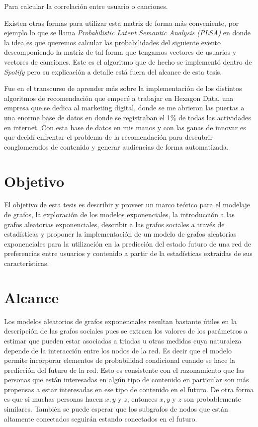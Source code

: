 Para calcular la correlación entre usuario o canciones.

Existen otras formas para utilizar esta matriz de forma más conveniente, por ejemplo lo que se llama \textit{Probabilistic Latent Semantic Analysis (PLSA)} en donde la idea es que queremos calcular las probabilidades del siguiente evento descomponiendo la matriz de tal forma que tengamos vectores de usuarios y vectores de canciones. Este es el algoritmo que de hecho se implementó dentro de \textit{Spotify} pero su explicación a detalle está fuera del alcance de esta tesis.

Fue en el transcurso de aprender más sobre la implementación de los distintos algoritmos de recomendación que empecé a trabajar en Hexagon Data, una empresa que se dedica al marketing digital, donde se me abrieron las puertas a una enorme base de datos en donde se registraban el 1\% de todas las actividades en internet. Con esta base de datos en mis manos y con las ganas de innovar es que decidí enfrentar el problema de la recomendación para descubrir conglomerados de contenido y generar audiencias de forma automatizada.


\section{Objetivo}

El objetivo de esta tesis es describir y proveer un marco teórico para el modelaje de grafos, la exploración de los modelos exponenciales, la introducción a las grafos aleatorias exponenciales, describir a las grafos sociales a través de estadísticas y proponer la implementación de un modelo de grafos aleatorias exponenciales para la utilización en la predicción del estado futuro de una red de preferencias entre usuarios y contenido a partir de la estadísticas extraídas de sus características. 


\section{Alcance}

Los modelos aleatorios de grafos exponenciales resultan bastante útiles en la descripción de las grafos sociales pues se extraen los valores de los parámetros a estimar que pueden estar asociadas a triadas u otras medidas cuya naturaleza depende de la interacción entre los nodos de la red. Es decir que el modelo permite incorporar elementos de probabilidad condicional cuando se hace la predicción del futuro de la red. Esto es consistente con el razonamiento que las personas que están interesadas en algún tipo de contenido en particular son más propensas a estar interesadas en ese tipo de contenido en el futuro. De otra forma es que si muchas personas hacen $x, y$ y $z$, entonces $x, y$ y $z$ son probablemente similares. También se puede esperar que los subgrafos de nodos que están altamente conectados seguirán estando conectados en el futuro.

